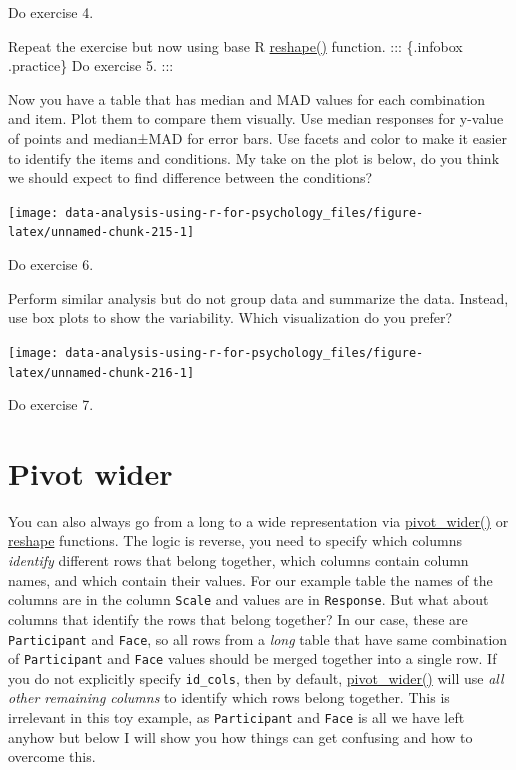 \documentclass[
]{book}
\begin{document}
Do exercise 4.

Repeat the exercise but now using base R \href{https://stat.ethz.ch/R-manual/R-patched/library/stats/html/reshape.html}{reshape()} function.
::: \{.infobox .practice\}
Do exercise 5.
:::

Now you have a table that has median and MAD values for each combination and item. Plot them to compare them visually. Use median responses for y-value of points and median±MAD for error bars. Use facets and color to make it easier to identify the items and conditions. My take on the plot is below, do you think we should expect to find difference between the conditions?

\begin{center}\texttt{[image: data-analysis-using-r-for-psychology\_files/figure-latex/unnamed-chunk-215-1]} \end{center}

Do exercise 6.

Perform similar analysis but do not group data and summarize the data. Instead, use box plots to show the variability. Which visualization do you prefer?

\begin{center}\texttt{[image: data-analysis-using-r-for-psychology\_files/figure-latex/unnamed-chunk-216-1]} \end{center}

Do exercise 7.

\hypertarget{pivot-wider}{%
\section{Pivot wider}\label{pivot-wider}}

You can also always go from a long to a wide representation via \href{https://tidyr.tidyverse.org/reference/pivot_wider.html}{pivot\_wider()} or \href{https://stat.ethz.ch/R-manual/R-patched/library/stats/html/reshape.html}{reshape} functions. The logic is reverse, you need to specify which columns \emph{identify} different rows that belong together, which columns contain column names, and which contain their values. For our example table the names of the columns are in the column \texttt{Scale} and values are in \texttt{Response}. But what about columns that identify the rows that belong together? In our case, these are \texttt{Participant} and \texttt{Face}, so all rows from a \emph{long} table that have same combination of \texttt{Participant} and \texttt{Face} values should be merged together into a single row. If you do not explicitly specify \texttt{id\_cols}, then by default, \href{https://tidyr.tidyverse.org/reference/pivot_wider.html}{pivot\_wider()} will use \emph{all other remaining columns} to identify which rows belong together. This is irrelevant in this toy example, as \texttt{Participant} and \texttt{Face} is all we have left anyhow but below I will show you how things can get confusing and how to overcome this.
\end{document}
